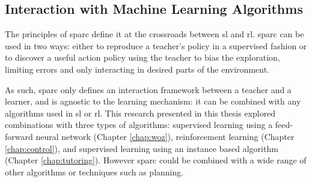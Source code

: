 

\subsection{Interaction with Machine Learning Algorithms}

The principles of \gls{sparc} define it at the crossroads between \gls{sl} and \gls{rl}. \gls{sparc} can be used in two ways: either to reproduce a teacher's policy in a supervised fashion or to discover a useful action policy using the teacher to bias the exploration, limiting errors and only interacting in desired parts of the environment.

As such, \gls{sparc} only defines an interaction framework between a teacher and a learner, and is agnostic to the learning mechanism: it can be combined with any algorithms used in \gls{sl} or \gls{rl}. This research presented in this thesis explored combinations with three types of algorithms: supervised learning using a feed-forward neural network (Chapter \ref{chap:woz}), reinforcement learning (Chapter \ref{chap:control}), and supervised learning using an instance based algorithm (Chapter \ref{chap:tutoring}). However \gls{sparc} could be combined with a wide range of other algorithms or techniques such as planning.


